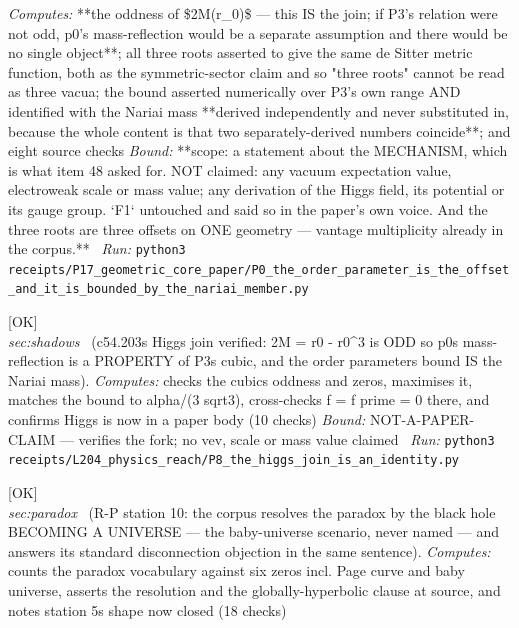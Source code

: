\begin{description}
\emph{Computes:} **the oddness of \$2M(r\_0)\$ --- this IS the join; if P3's relation were not odd, p0's mass-reflection would be a separate assumption and there would be no single object**; all three roots asserted to give the same de Sitter metric function, both as the symmetric-sector claim and so "three roots" cannot be read as three vacua; the bound asserted numerically over P3's own range AND identified with the Nariai mass **derived independently and never substituted in, because the whole content is that two separately-derived numbers coincide**; and eight source checks
 \emph{Bound:} **scope: a statement about the MECHANISM, which is what item 48 asked for. NOT claimed: any vacuum expectation value, electroweak scale or mass value; any derivation of the Higgs field, its potential or its gauge group. `F1` untouched and said so in the paper's own voice. And the three roots are three offsets on ONE geometry --- vantage multiplicity already in the corpus.**
\ \emph{Run:} \texttt{python3 receipts/P17\_geometric\_core\_paper/P0\_the\_order\_parameter\_is\_the\_offset\_and\_it\_is\_bounded\_by\_the\_nariai\_member.py}
\item[\label{rcpt:P8_the_higgs_join_is_an_identity}\texttt{P8\_the\_higgs\_join\_is\_an\_identity}]\hfill\textsf{[OK]}\\
\textit{sec:shadows} \ (c54.203s Higgs join verified: 2M = r0 - r0\textasciicircum{}3 is ODD so p0s mass-reflection is a PROPERTY of P3s cubic, and the order parameters bound IS the Nariai mass). 
\emph{Computes:} checks the cubics oddness and zeros, maximises it, matches the bound to alpha/(3 sqrt3), cross-checks f = f prime = 0 there, and confirms Higgs is now in a paper body (10 checks)
 \emph{Bound:} NOT-A-PAPER-CLAIM --- verifies the fork; no vev, scale or mass value claimed
\ \emph{Run:} \texttt{python3 receipts/L204\_physics\_reach/P8\_the\_higgs\_join\_is\_an\_identity.py}
\item[\label{rcpt:P9_the_resolution_is_the_baby_universe_one_and_it_is_never_named}\texttt{P9\_the\_resolution\_is\_the\_baby\_universe\_one\_and\_it\_is\_never\_named}]\hfill\textsf{[OK]}\\
\textit{sec:paradox} \ (R-P station 10: the corpus resolves the paradox by the black hole BECOMING A UNIVERSE --- the baby-universe scenario, never named --- and answers its standard disconnection objection in the same sentence). 
\emph{Computes:} counts the paradox vocabulary against six zeros incl. Page curve and baby universe, asserts the resolution and the globally-hyperbolic clause at source, and notes station 5s shape now closed (18 checks)

\end{description}

